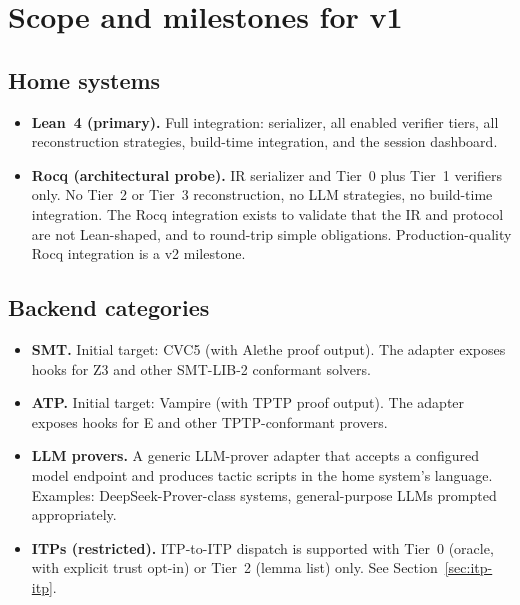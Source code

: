 \documentclass[11pt,letterpaper]{article}
\theoremstyle{definition}
\theoremstyle{remark}
\begin{document}
\section{Scope and milestones for v1}
\label{sec:scope}

\subsection{Home systems}

\begin{itemize}[leftmargin=2em]
  \item \textbf{Lean~4 (primary).} Full integration: serializer, all enabled
        verifier tiers, all reconstruction strategies, build-time integration,
        and the session dashboard.
  \item \textbf{Rocq (architectural probe).} IR serializer and Tier~0 plus
        Tier~1 verifiers only. No Tier~2 or Tier~3 reconstruction, no LLM
        strategies, no build-time integration. The Rocq integration exists
        to validate that the IR and protocol are not Lean-shaped, and to
        round-trip simple obligations. Production-quality Rocq integration
        is a v2 milestone.
\end{itemize}

\subsection{Backend categories}

\begin{itemize}[leftmargin=2em]
  \item \textbf{SMT.} Initial target: CVC5 (with Alethe proof output). The
        adapter exposes hooks for Z3 and other SMT-LIB-2 conformant solvers.
  \item \textbf{ATP.} Initial target: Vampire (with TPTP proof output).
        The adapter exposes hooks for E and other TPTP-conformant provers.
  \item \textbf{LLM provers.} A generic LLM-prover adapter that accepts a
        configured model endpoint and produces tactic scripts in the home
        system's language. Examples: DeepSeek-Prover-class systems,
        general-purpose LLMs prompted appropriately.
  \item \textbf{ITPs (restricted).} ITP-to-ITP dispatch is supported with
        Tier~0 (oracle, with explicit trust opt-in) or Tier~2 (lemma list)
        only. See Section~\ref{sec:itp-itp}.
\end{itemize}
\end{document}
